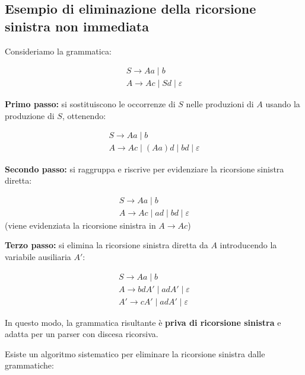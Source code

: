     \subsection{Esempio di eliminazione della ricorsione sinistra non immediata}

    Consideriamo la grammatica:
    
    \[
    \begin{array}{l}
    S \rightarrow Aa \mid b \\
    A \rightarrow Ac \mid Sd \mid \varepsilon
    \end{array}
    \]
    
    \textbf{Primo passo:} si sostituiscono le occorrenze di $S$ nelle produzioni di $A$ usando la produzione di $S$, ottenendo:
    
    \[
    \begin{array}{l}
    S \rightarrow Aa \mid b \\
    A \rightarrow Ac \mid (Aa)d \mid b d \mid \varepsilon
    \end{array}
    \]
    
    \textbf{Secondo passo:} si raggruppa e riscrive per evidenziare la ricorsione sinistra diretta:
    
    \[
    \begin{array}{l}
    S \rightarrow Aa \mid b \\
    A \rightarrow Ac \mid a d \mid b d \mid \varepsilon
    \end{array}
    \]
    (viene evidenziata la ricorsione sinistra in $A \rightarrow Ac$)
    
    \textbf{Terzo passo:} si elimina la ricorsione sinistra diretta da $A$ introducendo la variabile ausiliaria $A'$:
    
    \[
    \begin{array}{l}
    S \rightarrow Aa \mid b \\
    A \rightarrow b d A' \mid a d A' \mid \varepsilon \\
    A' \rightarrow c A' \mid a d A' \mid \varepsilon
    \end{array}
    \]
    
    In questo modo, la grammatica risultante è \textbf{priva di ricorsione sinistra} e adatta per un parser con discesa ricorsiva.
    
    

    Esiste un algoritmo sistematico per eliminare la ricorsione sinistra dalle grammatiche:


